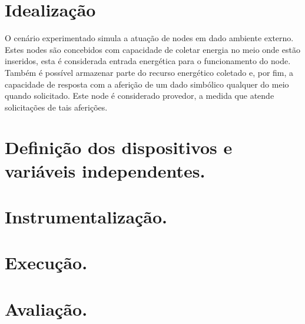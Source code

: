 \section{Idealização}
O cenário experimentado simula a atuação de nodes em dado ambiente externo. Estes nodes são concebidos com capacidade de coletar energia no meio onde estão inseridos, esta é considerada entrada energética para o funcionamento do node. Também é possível armazenar parte do recurso energético coletado e, por fim, a capacidade de resposta com a aferição de um dado simbólico qualquer do meio quando solicitado. Este node é considerado provedor, a medida que atende solicitações de tais aferições.

\section{Definição dos dispositivos e variáveis independentes.}
\section{Instrumentalização.}
\section{Execução.}
\section{Avaliação.}
 